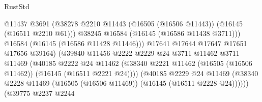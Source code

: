 \begin{lexlean}{RustStd}
\begin{coremodule}
                                              @11437
                                              @3691
                                              (@38278
                                                @2210
                                                @11443
                                                (@16505 (@16506 @11443))
                                                (@16145 (@16511 @2210 @61)))
                                              @38245
                                              @16584
                                              (@16145 (@16586 @11438 @3711)))
                                            @16584
                                            (@16145 (@16586 @11428 @11446)))
                                          @17641
                                          @17644
                                          @17647
                                          @17651
                                          @17656
                                          @39164)
                                        (@39840
                                          @11456
                                          @2222
                                          @2229
                                          @24
                                          @3711
                                          @11462
                                          @3711
                                          @11469
                                          (@40185
                                            @2222
                                            @24
                                            @11462
                                            (@38340
                                              @2221
                                              @11462
                                              (@16505 (@16506 @11462))
                                              (@16145 (@16511 @2221 @24))))
                                          (@40185
                                            @2229
                                            @24
                                            @11469
                                            (@38340
                                              @2228
                                              @11469
                                              (@16505 (@16506 @11469))
                                              (@16145 (@16511 @2228 @24))))))
                                      (@39775
                                        @2237
                                        @2244

\end{coremodule}
\end{lexlean}
